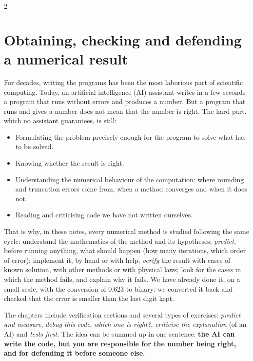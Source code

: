 \begin{paracol}{2}
\section{Obtaining, checking and defending a numerical result}\label{sec:intro_verificar-2}
For decades, writing the programs has been the most laborious part of scientific computing. Today, an artificial intelligence (AI) assistant writes in a few seconds a program that runs without errors and produces a number. But a program that runs and gives a number does not mean that the number is right. The hard part, which no assistant guarantees, is still:
\begin{itemize}
\item Formulating the problem precisely enough for the program to solve what has to be solved.
\item Knowing whether the result is right.
\item Understanding the numerical behaviour of the computation: where rounding and truncation errors come from, when a method converges and when it does not.
\item Reading and criticising code we have not written ourselves.
\end{itemize}
That is why, in these notes, every numerical method is studied following the same cycle: understand the mathematics of the method and its hypotheses; \emph{predict}, before running anything, what should happen (how many iterations, which order of error); implement it, by hand or with help; \emph{verify} the result with cases of known solution, with other methods or with physical laws; look for the cases in which the method fails, and explain why it fails. We have already done it, on a small scale, with the conversion of $0.623$ to binary: we converted it back and checked that the error is smaller than the last digit kept.

The chapters include verification sections and several types of exercises: \emph{predict and measure}, \emph{debug this code}, \emph{which one is right?}, \emph{criticise the explanation} (of an AI) and \emph{tests first}. The idea can be summed up in one sentence: \textbf{the AI can write the code, but you are responsible for the number being right, and for defending it before someone else.}
\end{paracol}

